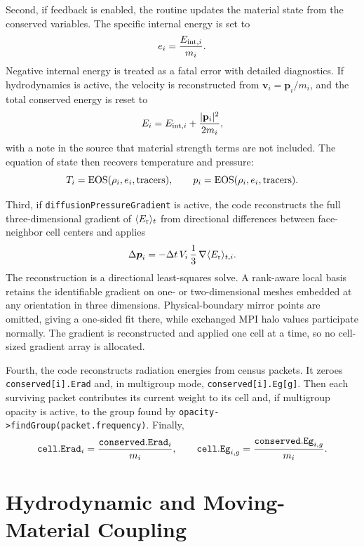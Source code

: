\documentclass[11pt]{article}
\newcommand{\dt}{\Delta t}
\newcommand{\vcell}{\mathbf{v}}
\newcommand{\mom}{\mathbf{p}}
\begin{document}
Second, if feedback is enabled, the routine updates the material state from the
conserved variables. The specific internal energy is set to
\begin{equation}
  e_i = \frac{E_{{\rm int},i}}{m_i}.
\end{equation}
Negative internal energy is treated as a fatal error with detailed diagnostics.
If hydrodynamics is active, the velocity is reconstructed from
\(\vcell_i=\mom_i/m_i\), and the total conserved energy is reset to
\begin{equation}
  E_i = E_{{\rm int},i}
        + \frac{|\mom_i|^2}{2m_i},
  \label{eq:hydro-energy-reset}
\end{equation}
with a note in the source that material strength terms are not included. The
equation of state then recovers temperature and pressure:
\[
  T_i = {\rm EOS}(\rho_i,e_i,\hbox{tracers}),
  \qquad
  p_i = {\rm EOS}(\rho_i,e_i,\hbox{tracers}).
\]

Third, if \texttt{diffusionPressureGradient} is active, the code reconstructs
the full three-dimensional gradient of \(\langle E_{\rm r}\rangle_t\) from
directional differences between face-neighbor cell centers and applies
\begin{equation}
  \Delta \boldsymbol{p}_i
  =
  -\dt\,V_i\,\frac{1}{3}\,
  \nabla\langle E_{\rm r}\rangle_{t,i}.
  \label{eq:pressure-gradient}
\end{equation}
The reconstruction is a directional least-squares solve.  A rank-aware local
basis retains the identifiable gradient on one- or two-dimensional meshes
embedded at any orientation in three dimensions.  Physical-boundary mirror
points are omitted, giving a one-sided fit there, while exchanged MPI halo
values participate normally.  The gradient is reconstructed and applied one
cell at a time, so no cell-sized gradient array is allocated.

Fourth, the code reconstructs radiation energies from census packets. It zeroes
\texttt{conserved[i].Erad} and, in multigroup mode, \texttt{conserved[i].Eg[g]}.
Then each surviving packet contributes its current weight to its cell and, if
multigroup opacity is active, to the group found by
\texttt{opacity->findGroup(packet.frequency)}. Finally,
\begin{equation}
  {\tt cell.Erad}_i = \frac{{\tt conserved.Erad}_i}{m_i},
  \qquad
  {\tt cell.Eg}_{i,g} = \frac{{\tt conserved.Eg}_{i,g}}{m_i}.
\end{equation}

\section{Hydrodynamic and Moving-Material Coupling}
\end{document}
